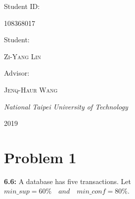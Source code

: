 \begin{titlepage}
	
	Student ID:

	\vspace{0.5\baselineskip}

	{\scshape 108368017}

	\vspace{0.5\baselineskip}

	Student: 
	
	\vspace{0.5\baselineskip} %

	{\scshape\Large Zi-Yang Lin } %

	\vspace{0.5\baselineskip} %


	Advisor:

	\vspace{0.5\baselineskip} %
	
	{\scshape\Large Jenq-Haur Wang} %
	
	\vspace{0.5\baselineskip} %
	
	\textit{National Taipei University of Technology} %
	
	\vfill %
	
	
	
	\vspace{0.3\baselineskip} %
	
	2019 %
	

\end{titlepage}


\clearpage

\section*{Problem 1}
\textbf{6.6:} A database has five transactions. Let $min\_sup=60\% \quad and \quad min\_conf=80\%$.

